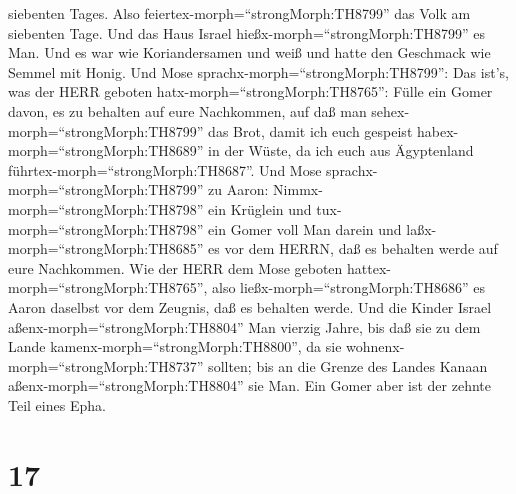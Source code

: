 siebenten Tages.  Also
feiertex-morph=``strongMorph:TH8799'' das Volk am siebenten Tage.
 Und das Haus Israel hießx-morph=``strongMorph:TH8799'' es
Man. Und es war wie Koriandersamen und weiß und hatte den Geschmack wie
Semmel mit Honig.  Und Mose
sprachx-morph=``strongMorph:TH8799'': Das ist's, was der HERR geboten
hatx-morph=``strongMorph:TH8765'': Fülle ein Gomer davon, es zu behalten
auf eure Nachkommen, auf daß man sehex-morph=``strongMorph:TH8799'' das
Brot, damit ich euch gespeist habex-morph=``strongMorph:TH8689'' in der
Wüste, da ich euch aus Ägyptenland führtex-morph=``strongMorph:TH8687''.
 Und Mose sprachx-morph=``strongMorph:TH8799'' zu Aaron:
Nimmx-morph=``strongMorph:TH8798'' ein Krüglein und
tux-morph=``strongMorph:TH8798'' ein Gomer voll Man darein und
laßx-morph=``strongMorph:TH8685'' es vor dem HERRN, daß es behalten
werde auf eure Nachkommen.  Wie der HERR dem Mose geboten
hattex-morph=``strongMorph:TH8765'', also
ließx-morph=``strongMorph:TH8686'' es Aaron daselbst vor dem Zeugnis,
daß es behalten werde.  Und die Kinder Israel
aßenx-morph=``strongMorph:TH8804'' Man vierzig Jahre, bis daß sie zu dem
Lande kamenx-morph=``strongMorph:TH8800'', da sie
wohnenx-morph=``strongMorph:TH8737'' sollten; bis an die Grenze des
Landes Kanaan aßenx-morph=``strongMorph:TH8804'' sie Man. 
Ein Gomer aber ist der zehnte Teil eines Epha.

\hypertarget{section-16}{%
\section{17}\label{section-16}}

